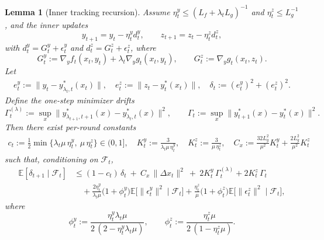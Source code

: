 \documentclass{uai2026} %
\newtheorem{lemma}{Lemma}[section]
\newcommand{\EE}{\mathbb{E}}
\newcommand{\F}{\mathcal{F}}
\begin{document}

\begin{lemma}[Inner tracking recursion]\label{lem:inner-stoch-correct}
Assume $\eta_t^y\le (L_f+\lambda_t L_g)^{-1}$ and $\eta_t^z\le L_g^{-1}$, and the inner updates
\[
y_{t+1}=y_t-\eta_t^y d_t^y,\qquad z_{t+1}=z_t-\eta_t^z d_t^z,
\]
with $d_t^y=G_t^y+\epsilon_t^y$ and $d_t^z=G_t^z+\epsilon_t^z$, where
\[
G_t^y:=\nabla_y f_t(x_t,y_t)+\lambda_t\nabla_y g_t(x_t,y_t),\qquad
G_t^z:=\nabla_y g_t(x_t,z_t).
\]
Let
\begin{align}\label{eq_def_delta}
e_t^y:=\|y_t-y^{*}_{\lambda_t,t}(x_t)\|,\quad
e_t^z:=\|z_t-y_t^{*}(x_t)\|,\quad
\delta_t:= (e_t^y)^2+(e_t^z)^2.
\end{align}
Define the one-step minimizer drifts
\[
\Gamma_t^{(\lambda)}:=\sup_x\|y^{*}_{\lambda_{t+1},t+1}(x)-y^{*}_{\lambda_t,t}(x)\|^2,\qquad
\Gamma_t:=\sup_x\|y^{*}_{t+1}(x)-y^{*}_t(x)\|^2.
\]
Then there exist per-round constants
\begin{align}\label{eq_c_t_K_t_C_x}
c_t:=\tfrac12\min\{\lambda_t\mu\,\eta_t^y,\ \mu\,\eta_t^z\}\in(0,1],\quad
K_t^y:= \frac{3}{\lambda_t\mu\,\eta_t^y},\quad
K_t^z:= \frac{3}{\mu\,\eta_t^z},\quad
C_{x}:=\frac{32L_{g}^{2}}{\mu^{2}}K_{t}^{y}+\frac{2L_{g}^{2}}{\mu^{2}}K_{t}^{z}
\end{align}
such that, conditioning on $\mathcal{F}_t$,
\begin{align}\label{eq:inner-track-rec}
\EE[\delta_{t+1}\mid\F_t]
&\le(1-c_t)\,\delta_t
~+~C_x\,\|\Delta x_t\|^2
~+~2K_t^y\,\Gamma_t^{(\lambda)}+2K_t^z\,\Gamma_t\nonumber\\
&\quad +\frac{2\eta_t^y}{\lambda_t\mu}\Big(1+\phi_t^y\Big)\EE\!\big[\|\epsilon_t^y\|^2\mid\F_t\big]
 +\frac{\eta_t^z}{\mu}\Big(1+\phi_t^z\Big)\EE\!\big[\|\epsilon_t^z\|^2\mid\F_t\big],
\end{align}
where
\[
\phi_t^y:=\frac{\eta_t^y\lambda_t\mu}{2\,(2-\eta_t^y\lambda_t\mu)},\qquad
\phi_t^z:=\frac{\eta_t^z\mu}{2\,(1-\eta_t^z\mu)}.
\]
\end{lemma}
\end{document}
